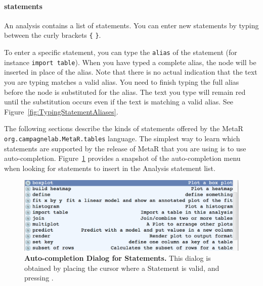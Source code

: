 \paragraph{statements}
An analysis contains a list of statements. You can enter new statements by typing between the curly brackets \texttt{\{} \texttt{\}}. 

To enter a specific statement, you can type the \texttt{alias} of the statement (for instance \texttt{import table}). When you have typed a complete alias, the node will be inserted in place of the alias. Note that there is no actual indication that the text you are typing matches a valid alias. You need to finish typing the full alias before the node is substituted for the alias. The text you type will remain red until the substitution occurs even if the text is matching a valid alias. See Figure~\ref{fig:TypingStatementAliases}.

\noindent The following sections describe the kinds of statements offered by the MetaR \texttt{org\allowbreak.campagnelab\allowbreak.MetaR\allowbreak.tables} language. The simplest way to learn which statements are supported by the release of MetaR that you are using is to use auto-completion. Figure~\ref{fig:AutoCompletionForStatements} provides a snapshot of the auto-completion menu when looking for statements to insert in the Analysis statement list. 
\begin{figure}[h!tbp]
  \centering
  \includegraphics[width=\figWidthWide]{figures/StatementAuto-completion.png}
\caption[Auto-completion Dialog for Statements.]{\textbf{Auto-completion Dialog for Statements.} This dialog is obtained by placing the cursor where a Statement is valid, and pressing \keys{\ctrl+\space}.}
\label{fig:AutoCompletionForStatements}
\end{figure}



